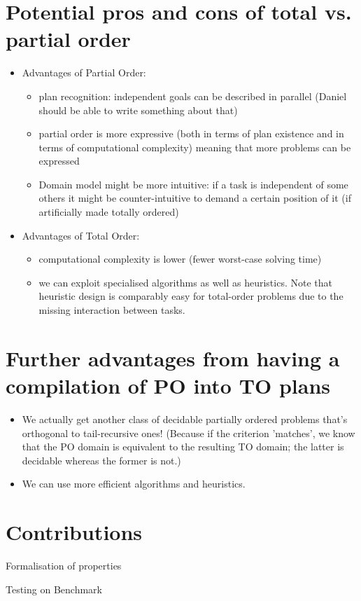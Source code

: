 \section{Potential pros and cons of total vs. partial order}
\begin{itemize}
	\item Advantages of Partial Order:
	\begin{itemize}
		\item plan recognition: independent goals can be described in parallel (Daniel should be able to write something about that)
		\item  partial order is more expressive (both in terms of plan existence and in terms of computational complexity) meaning that more problems can be expressed
		\item Domain model might be more intuitive: if a task is independent of some others it might be counter-intuitive to demand a certain position of it (if artificially made totally ordered)
	\end{itemize}
	\item Advantages of Total Order:
	\begin{itemize}
		\item computational complexity is lower (fewer worst-case solving time)
		\item we can exploit specialised algorithms as well as heuristics. Note that heuristic design is comparably easy for total-order problems due to the missing interaction between tasks.
	\end{itemize}
\end{itemize}

\section{Further advantages from having a compilation of PO into TO plans}
\begin{itemize}
	\item We actually get another class of decidable partially ordered problems that's orthogonal to tail-recursive ones! (Because if the criterion 'matches', we know that the PO domain is equivalent to the resulting TO domain; the latter is decidable whereas the former is not.) 
	\item We can use more efficient algorithms and heuristics. 
\end{itemize} 


\section{Contributions}

Formalisation of properties

Testing on Benchmark
